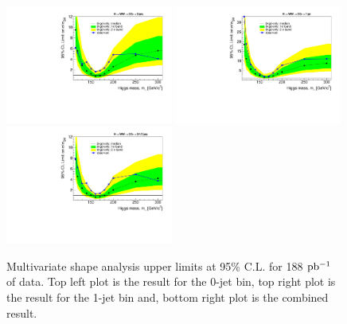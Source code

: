 \begin{figure}[!htbp]
\begin{center}
   \includegraphics[width=0.49\textwidth]{figures/limits_0j_200pb_shape_1.pdf}
   \includegraphics[width=0.49\textwidth]{figures/limits_1j_200pb_shape_1.pdf}
   \includegraphics[width=0.49\textwidth]{figures/limits_nj_200pb_shape_1.pdf}
   \caption{Multivariate shape analysis upper limits at 95\% C.L. for 188 $\mathrm{pb^{-1}}$ of data. Top left plot 
   is the result for the 0-jet bin, top right plot is the result for the 1-jet bin and, 
   bottom right plot is the combined result.}
   \label{fig:mvashape_uls_data}
\end{center}
\end{figure}
